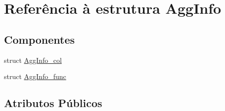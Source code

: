 \hypertarget{struct_agg_info}{\section{Referência à estrutura Agg\-Info}
\label{struct_agg_info}
}
\subsection*{Componentes}
\begin{DoxyCompactItemize}
\item 
struct \hyperlink{struct_agg_info_1_1_agg_info__col}{Agg\-Info\-\_\-col}
\item 
struct \hyperlink{struct_agg_info_1_1_agg_info__func}{Agg\-Info\-\_\-func}
\end{DoxyCompactItemize}
\subsection*{Atributos Públicos}
